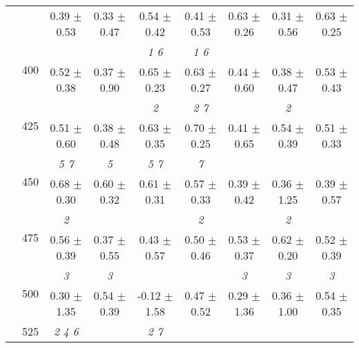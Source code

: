 \begin{table}[h]
{\begin{tabular}{
        ccccccccc}
 & & \cellcolor[HTML]{EFEFEF} 0.39 $\pm$ 0.53& \cellcolor[HTML]{EFEFEF} 0.33 $\pm$ 0.47& \cellcolor[HTML]{EFEFEF} 0.54 $\pm$ 0.42& \cellcolor[HTML]{EFEFEF} 0.41 $\pm$ 0.53& \cellcolor[HTML]{EFEFEF} 0.63 $\pm$ 0.26& \cellcolor[HTML]{EFEFEF} 0.31 $\pm$ 0.56& \cellcolor[HTML]{EFEFEF} 0.63 $\pm$ 0.25 \\ 
 & \multirow{2}{*}{400}& & & \textit{ 1 6 }& \textit{ 1 6 }& & &  \\ 
 & & 0.52 $\pm$ 0.38& 0.37 $\pm$ 0.90& 0.65 $\pm$ 0.23& 0.63 $\pm$ 0.27& 0.44 $\pm$ 0.60& 0.38 $\pm$ 0.47& 0.53 $\pm$ 0.43 \\ 
 & \multirow{2}{*}{425}& \cellcolor[HTML]{EFEFEF} & \cellcolor[HTML]{EFEFEF} & \cellcolor[HTML]{EFEFEF} \textit{ 2 }& \cellcolor[HTML]{EFEFEF} \textit{ 2 7 }& \cellcolor[HTML]{EFEFEF} & \cellcolor[HTML]{EFEFEF} \textit{ 2 }& \cellcolor[HTML]{EFEFEF}  \\ 
 & & \cellcolor[HTML]{EFEFEF} 0.51 $\pm$ 0.60& \cellcolor[HTML]{EFEFEF} 0.38 $\pm$ 0.48& \cellcolor[HTML]{EFEFEF} 0.63 $\pm$ 0.35& \cellcolor[HTML]{EFEFEF} 0.70 $\pm$ 0.25& \cellcolor[HTML]{EFEFEF} 0.41 $\pm$ 0.65& \cellcolor[HTML]{EFEFEF} 0.54 $\pm$ 0.39& \cellcolor[HTML]{EFEFEF} 0.51 $\pm$ 0.33 \\ 
 & \multirow{2}{*}{450}& \textit{ 5 7 }& \textit{ 5 }& \textit{ 5 7 }& \textit{ 7 }& & &  \\ 
 & & 0.68 $\pm$ 0.30& 0.60 $\pm$ 0.32& 0.61 $\pm$ 0.31& 0.57 $\pm$ 0.33& 0.39 $\pm$ 0.42& 0.36 $\pm$ 1.25& 0.39 $\pm$ 0.57 \\ 
 & \multirow{2}{*}{475}& \cellcolor[HTML]{EFEFEF} \textit{ 2 }& \cellcolor[HTML]{EFEFEF} & \cellcolor[HTML]{EFEFEF} & \cellcolor[HTML]{EFEFEF} \textit{ 2 }& \cellcolor[HTML]{EFEFEF} & \cellcolor[HTML]{EFEFEF} \textit{ 2 }& \cellcolor[HTML]{EFEFEF}  \\ 
 & & \cellcolor[HTML]{EFEFEF} 0.56 $\pm$ 0.39& \cellcolor[HTML]{EFEFEF} 0.37 $\pm$ 0.55& \cellcolor[HTML]{EFEFEF} 0.43 $\pm$ 0.57& \cellcolor[HTML]{EFEFEF} 0.50 $\pm$ 0.46& \cellcolor[HTML]{EFEFEF} 0.53 $\pm$ 0.37& \cellcolor[HTML]{EFEFEF} 0.62 $\pm$ 0.20& \cellcolor[HTML]{EFEFEF} 0.52 $\pm$ 0.39 \\ 
 & \multirow{2}{*}{500}& \textit{ 3 }& \textit{ 3 }& & & \textit{ 3 }& \textit{ 3 }& \textit{ 3 } \\ 
 & & 0.30 $\pm$ 1.35& 0.54 $\pm$ 0.39& -0.12 $\pm$ 1.58& 0.47 $\pm$ 0.52& 0.29 $\pm$ 1.36& 0.36 $\pm$ 1.00& 0.54 $\pm$ 0.35 \\ 
 & \multirow{2}{*}{525}& \cellcolor[HTML]{EFEFEF} \textit{ 2 4 6 }& \cellcolor[HTML]{EFEFEF} & \cellcolor[HTML]{EFEFEF} \textit{ 2 7 }& \cellcolor[HTML]{EFEFEF} & \cellcolor[HTML]{EFEFEF} & \cellcolor[HTML]{EFEFEF} & \cellcolor[HTML]{EFEFEF}  \\ 

\end{tabular}}
\end{table}
